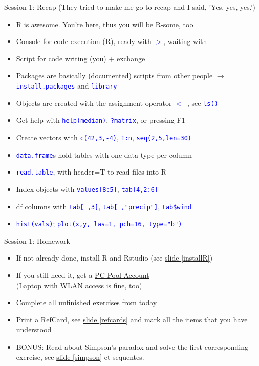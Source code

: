 \documentclass[xcolor=table,       handout,    xcolor=dvipsnames]{beamer}\usepackage[]{graphicx}\usepackage[]{color}
\newcommand{\rcode}[1]{\texttt{\textcolor{Blue}{#1}}} %
\begin{document}
\begin{frame}{Session 1: Recap \footnotesize{(They tried to make me go to recap and I said, 'Yes, yes, yes.')}}
\pause
\begin{itemize}[<+->]
  \item R is awesome. You're here, thus you will be R-some, too
  \item Console for code execution (R), ready with \rcode{$>$}, waiting with \rcode{$+$}
  \item Script for code writing (you) + exchange
  \item Packages are basically (documented) scripts from other people $\rightarrow$ \rcode{install.packages} and \rcode{library}
  \item Objects are created with the assignment operator \rcode{$<$-}, see \rcode{ls()} %
  \item Get help with \rcode{help(median)}, \rcode{?matrix}, or pressing F1
  \item Create vectors with \rcode{c(42,3,-4)}, \rcode{1:n}, \rcode{seq(2,5,len=30)}
  \item \rcode{data.frame}s hold tables with one data type per column
  \item \rcode{read.table}, with header=T to read files into R
  \item Index objects with \rcode{values[8:5]}, \rcode{tab[4,2:6]}
  \item df columns with \rcode{tab[ ,3]}, \rcode{tab[ ,"precip"]}, \rcode{tab\$wind}
  \item \rcode{hist(vals)}; \rcode{plot(x,y, las=1, pch=16, type="b")}
\end{itemize}
\end{frame}


\begin{frame}{Session 1: Homework}
\pause
\begin{itemize}[<+->]
  \item If not already done, install R and Rstudio (see \hyperlink{installR}{slide \ref{installR}})
  \item If you still need it, get a \href{http://www.chem.uni-potsdam.de/groups/pools/Studierende/studierende.html}{PC-Pool Account} \\(Laptop with \href{http://www.zeik.uni-potsdam.de/wlan.html}{WLAN access} is fine, too)
  \item Complete all unfinished exercises from today
  \item Print a RefCard, see \hyperlink{refcards}{slide \ref{refcards}} and mark all the items that you have understood
  \item BONUS: Read about Simpson's paradox and solve the first corresponding exercise, see \hyperlink{simpson}{slide \ref{simpson}} et sequentes.
\end{itemize}
\end{frame}
\end{document}
